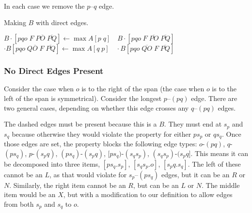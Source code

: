 In each case we remove the $p$--$q$ edge.

\begin{finalEquation}
\caption{Making $B$ with direct edges.}
  $B\cdotp [pqo \; F \; P\overline{O} \; \overline{PQ}] \leftarrow \max A[p \; q] \quad B\cdotp [pqo \; F \; \overline{PO} \; \overline{PQ}]$ \\
  $\cdotp B[pqo \; Q\overline{O} \; F \; \overline{PQ}] \leftarrow \max A[q \; p] \quad \cdotp B[pqo \; \overline{QO} \; F \; \overline{PQ}]$
\end{finalEquation}

\subsubsection{No Direct Edges Present}
Consider the case when $o$ is to the right of the span (the case when $o$ is to the left of the span is symmetrical).
Consider the longest $p$--$(pq)$ edge.
There are two general cases, depending on whether this edge crosses any $q$--$(pq)$ edges.

\begin{center}
\end{center}

The dashed edges must be present because this is a $B$.
They must end at $s_p$ and $s_q$ because otherwise they would violate the \oneEC property for either $ps_p$ or $qs_q$.
Once those edges are set, the \oneEC property blocks the following edge types:
$o$-$(pq)$,
$q$-$(ps_q)$,
$p$-$(s_pq)$,
$(ps_q)$-$(s_pq)$,
$[ps_q)$-$(s_qs_p)$,
$(s_qs_p)$-$(s_pq]$.
This means it can be decomposed into three items, $[ps_q.s_p]$, $[s_qs_p.o]$, $[s_pq.s_q]$.
The left of these cannot be an $L$, as that would violate \oneEC for $s_p$--$(ps_q)$ edges, but it can be an $R$ or $N$.
Similarly, the right item cannot be an $R$, but can be an $L$ or $N$.
The middle item would be an $X$, but with a modification to our definition to allow edges from both $s_p$ and $s_q$ to $o$.

